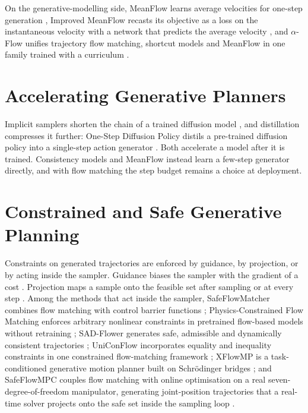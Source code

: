 On the generative-modelling side, MeanFlow learns average velocities for one-step generation
\parencite{geng2025meanflow}, Improved MeanFlow recasts its objective as a loss on the instantaneous
velocity with a network that predicts the average velocity \parencite{geng2025imf}, and $\alpha$-Flow
unifies trajectory flow matching, shortcut models and MeanFlow in one family trained with a curriculum
\parencite{zhang2025alphaflow}.

\section{Accelerating Generative Planners}\label{sec:rel:accel}

Implicit samplers shorten the chain of a trained diffusion model \parencite{song2021denoising}, and
distillation compresses it further: One-Step Diffusion Policy distils a pre-trained diffusion policy
into a single-step action generator \parencite{wang2024onedp}. Both accelerate a model after it is
trained. Consistency models \parencite{song2023consistency} and MeanFlow \parencite{geng2025meanflow}
instead learn a few-step generator directly, and with flow matching the step budget remains a choice at
deployment.

\section{Constrained and Safe Generative Planning}\label{sec:rel:safety}

Constraints on generated trajectories are enforced by guidance, by projection, or by acting inside the
sampler. Guidance biases the sampler with the gradient of a cost \parencite{carvalho2025motion}.
Projection maps a sample onto the feasible set after sampling \parencite{power2023sampling} or at every
step \parencite{christopher2024constrained,romer2025diffusion}. Among the methods that act inside the
sampler, SafeFlowMatcher combines flow matching with control barrier functions
\parencite{yang2025safeflowmatcher}; Physics-Constrained Flow Matching enforces arbitrary nonlinear
constraints in pretrained flow-based models without retraining \parencite{utkarsh2025pcfm}; SAD-Flower
generates safe, admissible and dynamically consistent trajectories \parencite{huang2025sadflower};
UniConFlow incorporates equality and inequality constraints in one constrained flow-matching framework
\parencite{yang2025uniconflow}; XFlowMP is a task-conditioned generative motion planner built on
Schr\"odinger bridges \parencite{nguyen2025xflowmp}; and SafeFlowMPC couples flow matching with online
optimisation on a real seven-degree-of-freedom manipulator, generating joint-position trajectories
that a real-time solver projects onto the safe set inside the sampling loop
\parencite[Sec.~III]{oelerich2026safeflowmpc}.

